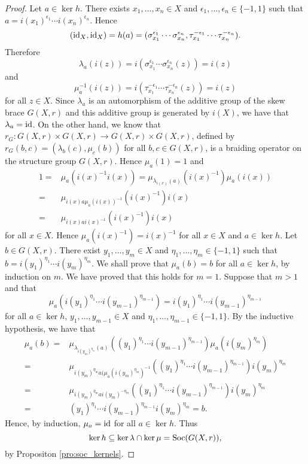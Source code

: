 \begin{proof}
Let $a\in \ker h$. There exists $x_1,\dots ,x_n\in X$ and $\epsilon_1,\dots ,\epsilon_n\in\{ -1,1\}$ such that
$a=i(x_1)^{\epsilon_1}\cdots i(x_n)^{\epsilon_n}$. Hence
\[(\operatorname{id}_X,\operatorname{id}_X)=h(a)=(\sigma_{x_1}^{\epsilon_1}\cdots\sigma_{x_n}^{\epsilon_n},\tau_{x_1}^{-\epsilon_1}\cdots \tau_{x_n}^{-\epsilon_n}).\]
Therefore
\[ \lambda_a(i(z))=i(\sigma_{x_1}^{\epsilon_1}\cdots\sigma_{x_n}^{\epsilon_n}(z))=i(z)\]
and
\[ \mu^{-1}_a(i(z))=i(\tau_{x_1}^{-\epsilon_1}\cdots \tau_{x_n}^{-\epsilon_n}(z))=i(z)\]
for all $z\in X$. Since $\lambda_a$ is an automorphism of the additive group of the skew brace $G(X,r)$ and this additive group is generated by $i(X)$, we have that $\lambda_a=\operatorname{id}$. On the other hand, we know that $r_G: G(X,r)\times G(X,r)\to G(X,r)\times G(X,r)$, defined by $r_G(b,c)=(\lambda_b(c),\mu_c(b))$ for all $b,c\in G(X,r)$, is a braiding operator on the structure group $G(X,r)$. Hence $\mu_a(1)=1$ and
\begin{align*}
    1=&\mu_a(i(x)^{-1}i(x))=\mu_{\lambda_{i(x)}(a)}(i(x)^{-1})\mu_a(i(x))\\
    =&\mu_{i(x)a\mu_a(i(x))^{-1}}(i(x)^{-1})i(x)\\
    =&\mu_{i(x)ai(x)^{-1}}(i(x)^{-1})i(x)
    \end{align*}
 for all $x\in X$. Hence $\mu_a(i(x)^{-1})=i(x)^{-1}$ for all $x\in X$ and $a\in \ker h$. Let $b\in G(X,r)$. There exist $y_1,\dots ,y_m\in X$ and $\eta_1, \dots ,\eta_m\in\{ -1,1\}$ such that $b=i(y_1)^{\eta_1}\cdots i(y_m)^{\eta_m}$. We shall prove that $\mu_a(b)=b$ for all $a\in\ker h$, by induction on $m$.
 We have proved that this holds for $m=1$. Suppose that $m>1$ and that
 \[\mu_a(i(y_1)^{\eta_1}\cdots i(y_{m-1})^{\eta_{m-1}})=i(y_1)^{\eta_1}\cdots i(y_{m-1})^{\eta_{m-1}}\]
 for all $a\in\ker h$, $y_1,\dots ,y_{m-1}\in X$ and $\eta_1, \dots ,\eta_{m-1}\in\{ -1,1\}$. 
 By the inductive hypothesis, we have that
 \begin{align*}
     \mu_a(b)=& \mu_{\lambda_{i(y_m)^{\eta_m}}(a)}((y_1)^{\eta_1}\cdots i(y_{m-1})^{\eta_{m-1}})\mu_a(i(y_m)^{\eta_m})\\
     =& \mu_{i(y_m)^{\eta_m}a(\mu_a(i(y_m)^{\eta_m})^{-1}}((y_1)^{\eta_1}\cdots i(y_{m-1})^{\eta_{m-1}})i(y_m)^{\eta_m}\\
     =& \mu_{i(y_m)^{\eta_m}ai(y_m)^{-\eta_m}}((y_1)^{\eta_1}\cdots i(y_{m-1})^{\eta_{m-1}})i(y_m)^{\eta_m}\\
     =& (y_1)^{\eta_1}\cdots i(y_{m-1})^{\eta_{m-1}}i(y_m)^{\eta_m}=b.
 \end{align*}
Hence, by induction, $\mu_a=\operatorname{id}$ for all $a\in\ker h$. Thus 
\[\ker h\subseteq \ker\lambda\cap\ker\mu=\operatorname{Soc}(G(X,r)),\]
by Propositon \ref{pro:soc_kernels}.
\end{proof}


